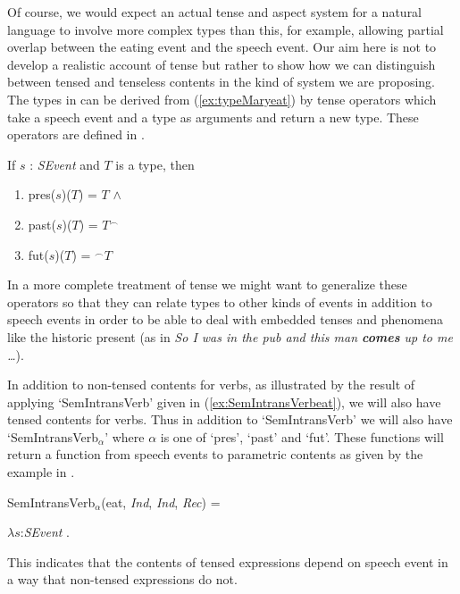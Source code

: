 Of course, we would expect an actual tense and aspect system for a
natural language to involve more complex types than this, for example,
allowing partial overlap between the eating event and the speech
event.  Our aim here is not to develop a realistic account of tense
but rather to show how we can distinguish between tensed and tenseless
contents in the kind of system we are proposing. The types in
\preveg{} can be derived from (\ref{ex:typeMaryeat}) by tense
operators which take  a speech event and a type as arguments and return
a new type.  These operators are defined in \nexteg{}.
\begin{ex} 
If $s$ : \textit{SEvent} and $T$ is a type, then
\begin{enumerate} 
 
\item pres($s$)($T$) = $T$ \d{$\wedge$}  
 
\item past($s$)($T$) =
  $T^{\frown}$

\item fut($s$)($T$) = $^{\frown}T$ 
 
\end{enumerate} 
   
\end{ex} 
In a more complete treatment of tense we might want to generalize
these operators so that they can relate types to other kinds of events
in addition to speech events in order to be able to deal with embedded
tenses and phenomena like the historic present (as in \textit{So I was
  in the pub and this man \textbf{comes} up to me \ldots}).  

In addition to non-tensed contents for verbs, as illustrated by the
result of applying `SemIntransVerb' given in
(\ref{ex:SemIntransVerbeat}), we will also have tensed contents for
verbs.  Thus in addition to `SemIntransVerb' we will also have
`SemIntransVerb$_\alpha$' where $\alpha$ is one of `pres', `past' and
`fut'.  These functions will return a function from speech events to
parametric contents as given by the example in \nexteg{}.
\begin{ex} 
SemIntransVerb$_\alpha$(eat,
\textit{Ind}, \textit{Ind}, \textit{Rec}) = 

$\lambda s$:\textit{SEvent} . 
\end{ex} 
This indicates that the contents of tensed expressions depend on
speech event in a way that non-tensed expressions do not.

